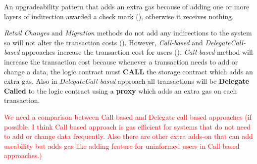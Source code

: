  An upgradeability pattern that adds an extra gas because of adding one or more layers of indirection awarded a check mark (\checkmark), otherwise it receives nothing.

\textit{Retail Changes} and \textit{Migration} methods do not add any indirections to the system so will not alter the transaction costs (\Circle). However, \textit{Call-based} and \textit{DelegateCall-based} approaches increase the transaction cost for users (\checkmark). \textit{Call-based} method will increase the transaction cost because whenever a transaction needs to add or change a data, the logic contract must \textbf{CALL} the storage contract which adds an extra gas. Also in \textit{DelegateCall-based} approach all transactions will be \textbf{Delegate Called} to the logic contract using a \textbf{proxy} which adds an extra gas on each transaction. 

\textcolor{red}{We need a comparison between Call based and Delegate call based approaches (if possible. I think Call based approach is gas efficient for systems that do not need to add or change data frequently. Also there are other extra adds-on that can add useability but adds gas like adding feature for uninformed users in Call based approaches.)}


 


